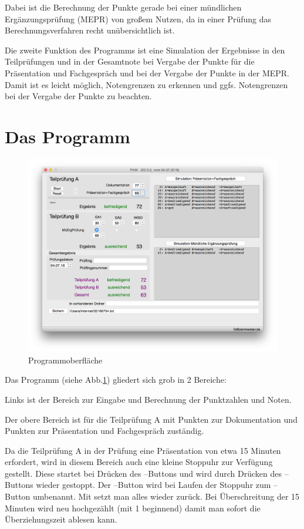 \documentclass[a4paper,notitlepage,parskip=half]{scrartcl}
\begin{document}
Dabei ist die Berechnung der Punkte gerade bei einer mündlichen Ergänzungsprüfung (MEPR) von großem Nutzen, da in einer Prüfung das Berechnungsverfahren recht unübersichtlich ist.

Die zweite Funktion des Programms ist eine Simulation der Ergebnisse in den Teilprüfungen und in der Gesamtnote bei Vergabe der Punkte für die Präsentation und Fachgespräch und bei der Vergabe der Punkte in der MEPR.
Damit ist es leicht möglich, Notengrenzen zu erkennen und ggfs. Notengrenzen bei der Vergabe der Punkte zu beachten.

\section{Das Programm}

\begin{figure}[ht]
	\centering
  \includegraphics[width=\textwidth]{pihk.png}
	\caption{Programmoberfläche}
	\label{fig:pihk}
\end{figure}

Das Programm (siehe Abb.\ref{fig:pihk}) gliedert sich grob in 2 Bereiche:

Links ist der Bereich zur Eingabe und Berechnung der Punktzahlen und Noten.

Der obere Bereich ist für die Teilprüfung A mit Punkten zur Dokumentation und Punkten zur Präsentation und Fachgespräch zuständig.

Da die Teilprüfung A in der Prüfung eine Präsentation von etwa 15 Minuten erfordert, wird in diesem Bereich auch eine kleine Stoppuhr zur Verfügung gestellt. Diese startet bei Drücken des --Buttons und wird durch Drücken des --Buttons wieder gestoppt. Der --Button wird bei Laufen der Stoppuhr zum --Button umbenannt.
Mit  setzt man alles wieder zurück.
Bei Überschreitung der 15 Minuten wird neu hochgezählt (mit 1 beginnend) damit man sofort die Überziehungszeit ablesen kann.
\end{document}
